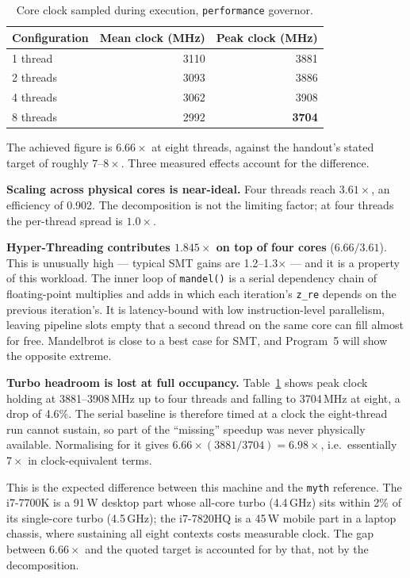 \documentclass[11pt,a4paper]{article}
\begin{document}
\begin{table}[H]
\centering
\begin{tabular}{lrr}
\toprule
Configuration & Mean clock (MHz) & Peak clock (MHz) \\
\midrule
1 thread  & 3110 & 3881 \\
2 threads & 3093 & 3886 \\
4 threads & 3062 & 3908 \\
8 threads & 2992 & \textbf{3704} \\
\bottomrule
\end{tabular}
\caption{Core clock sampled during execution, \texttt{performance} governor.}
\label{tab:p1clock}
\end{table}

The achieved figure is $6.66\times$ at eight threads, against the handout's
stated target of roughly $7$--$8\times$. Three measured effects account for the
difference.

\textbf{Scaling across physical cores is near-ideal.} Four threads reach
$3.61\times$, an efficiency of 0.902. The decomposition is not the limiting
factor; at four threads the per-thread spread is $1.0\times$.

\textbf{Hyper-Threading contributes $1.845\times$ on top of four cores}
($6.66 / 3.61$). This is unusually high --- typical SMT gains are 1.2--1.3$\times$
--- and it is a property of this workload. The inner loop of \texttt{mandel()}
is a serial dependency chain of floating-point multiplies and adds in which
each iteration's \texttt{z\_re} depends on the previous iteration's. It is
latency-bound with low instruction-level parallelism, leaving pipeline slots
empty that a second thread on the same core can fill almost for free.
Mandelbrot is close to a best case for SMT, and Program~5 will show the
opposite extreme.

\textbf{Turbo headroom is lost at full occupancy.} Table~\ref{tab:p1clock}
shows peak clock holding at 3881--3908\,MHz up to four threads and falling to
3704\,MHz at eight, a drop of 4.6\%. The serial baseline is therefore timed at
a clock the eight-thread run cannot sustain, so part of the ``missing''
speedup was never physically available. Normalising for it gives
$6.66 \times (3881/3704) = 6.98\times$, i.e.\ essentially $7\times$ in
clock-equivalent terms.

This is the expected difference between this machine and the \texttt{myth}
reference. The i7-7700K is a 91\,W desktop part whose all-core turbo (4.4\,GHz)
sits within 2\% of its single-core turbo (4.5\,GHz); the i7-7820HQ is a 45\,W
mobile part in a laptop chassis, where sustaining all eight contexts costs
measurable clock. The gap between $6.66\times$ and the quoted target is
accounted for by that, not by the decomposition.
\end{document}
